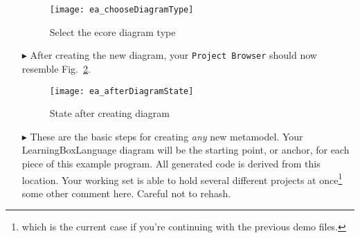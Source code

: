\begin{itemize}
\begin{figure}[htbp]
	\centering
  \texttt{[image: ea\_chooseDiagramType]}
	\caption{Select the ecore diagram type}
	\label{fig:diagram_type}
\end{figure}
\FloatBarrier

 
\item[$\blacktriangleright$] After creating the new diagram, your  \texttt{Project Browser} should now resemble Fig.~\ref{fig:diagram_completed}.

\begin{figure}[htbp]
	\centering
  \texttt{[image: ea\_afterDiagramState]}
	\caption{State after creating diagram}
	\label{fig:diagram_completed}
\end{figure}
\FloatBarrier

\item[$\blacktriangleright$] These are the basic steps for creating \emph{any} new metamodel. Your LearningBoxLanguage diagram will be the starting point, or
anchor, for each piece of this example program. All generated code is derived from this location. Your working set is able to hold several different projects at
once\footnote{which is the current case if you're continuing with the previous demo files.} some other comment here. Careful not to rehash.

\end{itemize}
